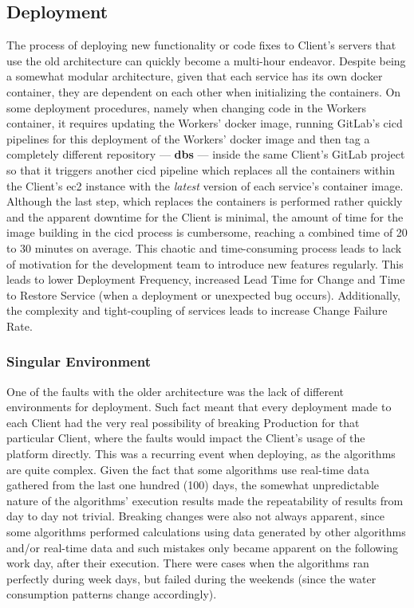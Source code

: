 \subsection{Deployment}\label{methodology:ss:deployment}

The process of deploying new functionality or code fixes to Client's servers that use the old architecture can quickly become a multi-hour endeavor. Despite being a somewhat modular architecture, given that each service has its own docker container, they are dependent on each other when initializing the containers. On some deployment procedures, namely when changing code in the Workers container, it requires updating the Workers' docker image, running GitLab's \gls{cicd} pipelines for this deployment of the Workers' docker image and then tag a completely different repository —  \textbf{dbs} — inside the same Client's GitLab project so that it triggers another \gls{cicd} pipeline which replaces all the containers within the Client's \gls{ec2} instance with the \textit{latest} version of each service's container image. Although the last step, which replaces the containers is performed rather quickly and the apparent downtime for the Client is minimal, the amount of time for the image building in the \gls{cicd} process is cumbersome, reaching a combined time of 20 to 30 minutes on average. This chaotic and time-consuming process leads to lack of motivation for the development team to introduce new features regularly. This leads to lower Deployment Frequency, increased Lead Time for Change and Time to Restore Service (when a deployment or unexpected bug occurs). Additionally, the complexity and tight-coupling of services leads to increase Change Failure Rate. 

\subsubsection{Singular Environment}\label{methodology:sss:singular-environment}

One of the faults with the older architecture was the lack of different environments for deployment. Such fact meant that every deployment made to each Client had the very real possibility of breaking Production for that particular Client, where the faults would impact the Client's usage of the platform directly. This was a recurring event when deploying, as the algorithms are quite complex. Given the fact that some algorithms use real-time data gathered from the last one hundred (100) days, the somewhat unpredictable nature of the algorithms' execution results made the repeatability of results from day to day not trivial.
Breaking changes were also not always apparent, since some algorithms performed calculations using data generated by other algorithms and/or real-time data and such mistakes only became apparent on the following work day, after their execution. There were cases when the algorithms ran perfectly during week days, but failed during the weekends (since the water consumption patterns change accordingly).

